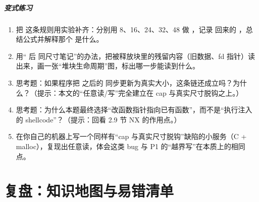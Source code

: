 \documentclass[UTF8,12pt,oneside]{ctexbook}
\begin{document}
\paragraph{变式练习}
\begin{enumerate}
\item 把  这条规则用实验补齐：分别用 8、16、24、32、48 做 ，记录  回来的 ，总结公式并解释那个  是什么。
\item 用“ 后  同尺寸笔记”的办法，把被释放块里的残留内容（旧数据、fd 指针）读出来，画一张“堆块生命周期”图，标出哪一步能读到什么。
\item 思考题：如果程序把  之后的  同步更新为真实大小，这条链还成立吗？为什么？（提示：本文的“任意读/写”完全建立在 cap 与真实尺寸脱钩之上。）
\item 思考题：为什么本题最终选择“改函数指针指向已有函数”，而不是“执行注入的 shellcode”？（提示：回看 2.9 节 NX 的作用点。）
\item 在你自己的机器上写一个同样有“cap 与真实尺寸脱钩”缺陷的小服务（C + malloc），复现出任意读，体会这类 bug 与 P1 的“越界写”在本质上的相同点。
\end{enumerate}



\chapter{复盘：知识地图与易错清单}
\end{document}
